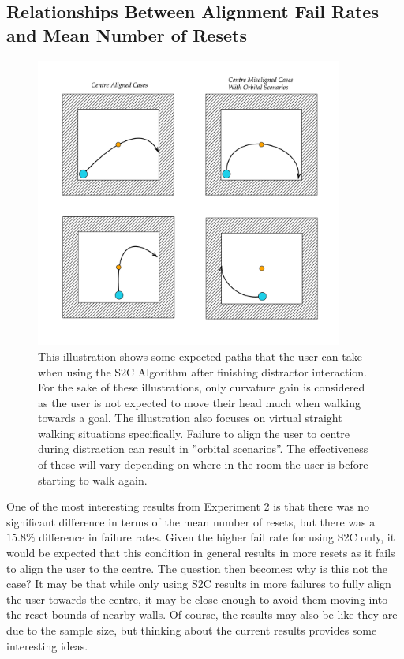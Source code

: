 \subsection{Relationships Between Alignment Fail Rates and Mean Number of Resets}\label{sec:orbitalCases}
\begin{figure}[tbph]
    \centering
    \includegraphics[width=0.9\textwidth]{figures/graphs/orbitalcases.png}
    \caption[Various S2C Redirection Scenarios During Success/Failure of Centre Alignment]{This illustration shows some expected paths that the user can take when using the S2C Algorithm after finishing distractor interaction. For the sake of these illustrations, only curvature gain is considered as the user is not expected to move their head much when walking towards a goal. The illustration also focuses on virtual straight walking situations specifically. Failure to align the user to centre during distraction can result in ''orbital scenarios''. The effectiveness of these will vary depending on where in the room the user is before starting to walk again.}
    \label{fig:orbitalCases}
\end{figure}

One of the most interesting results from Experiment 2 is that there was no significant difference in terms of the mean number of resets, but there was a $15.8\%$ difference in failure rates. Given the higher fail rate for using S2C only, it would be expected that this condition in general results in more resets as it fails to align the user to the centre. The question then becomes: why is this not the case? It may be that while only using S2C results in more failures to fully align the user towards the centre, it may be close enough to avoid them moving into the reset bounds of nearby walls. Of course, the results may also be like they are due to the sample size, but thinking about the current results provides some interesting ideas. 

